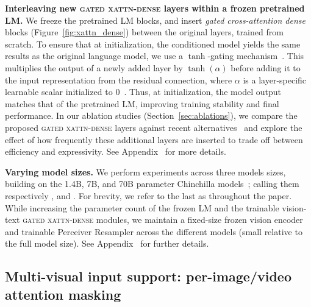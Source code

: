 \textbf{Interleaving new \textsc{gated xattn-dense} layers within a frozen pretrained LM.} 
We freeze the pretrained LM blocks, and insert \textit{gated cross-attention dense} blocks (Figure~\ref{fig:xattn_dense}) between the original layers, trained from scratch.
To ensure that at initialization, the conditioned model yields the same results as the original language model, we use a $\tanh$-gating mechanism~\citep{hochreiter1997long}.
This multiplies the output of a newly added layer by $\tanh(\alpha)$ before adding it to the input representation from the residual connection, where $\alpha$ is a layer-specific learnable scalar initialized to $0$~\cite{bachlechner2021rezero}.
Thus, at initialization, the model output matches that of the pretrained LM, improving training stability and final performance.
In our ablation studies (Section~\ref{sec:ablations}), we compare the proposed \textsc{gated xattn-dense} layers against recent alternatives~\citep{desai2021virtex,luo2022vc} and explore the effect of how frequently these additional layers are inserted to trade off between efficiency and expressivity.
See Appendix~ for more details.

\textbf{Varying model sizes.}
We perform experiments across three models sizes, building on the 1.4B, 7B, and 70B parameter Chinchilla models~\citep{chinchilla}; calling them respectively \base{}, \medium{} and \largemfull{}.
For brevity, we refer to the last as \largem{} throughout the paper.
While increasing the parameter count of the frozen LM and the trainable vision-text \textsc{gated xattn-dense} modules, we maintain a fixed-size frozen vision encoder and trainable Perceiver Resampler across the different models (small relative to the full model size).
See Appendix~ for further details.


\subsection{Multi-visual input support: per-image/video attention masking}
\label{sec:multi_im_att}


